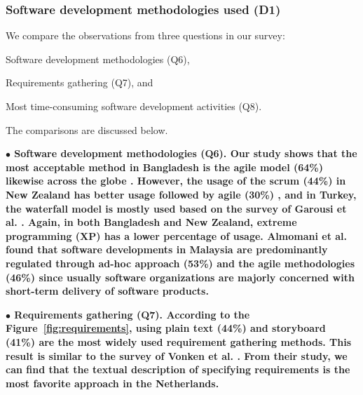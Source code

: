 \subsubsection{Software development methodologies used (D1)}\label{sec:rq2-d1}
% 

We compare the observations from three questions in our survey: \begin{inparaenum}
\item Software development methodologies (Q6),
\item Requirements gathering (Q7), and
\item Most time-consuming software development activities (Q8).
\end{inparaenum} The comparisons are discussed below.

\nd\bf{$\bullet$ Software development methodologies (Q6).} Our study shows that
the most acceptable method in Bangladesh is the agile model (64\%) likewise
across the globe \citep{StackoverflowSurvey2018}. However, the usage of the
scrum (44\%) in New Zealand has better usage followed by agile (30\%)
\citep{Wang2018}, and in Turkey, the waterfall model is mostly used based on the
survey of Garousi et al. \citep{Garousi2015}. Again, in both Bangladesh and New
Zealand, extreme programming (XP) has a lower percentage of usage. Almomani et
al. \citep{Almomani2015} found that software developments in Malaysia are
predominantly regulated through ad-hoc approach (53\%) and the agile
methodologies (46\%) since usually software organizations are majorly concerned
with short-term delivery of software products.

\nd\bf{$\bullet$ Requirements gathering (Q7).} According to the
Figure~\ref{fig:requirements}, using plain text (44\%) and storyboard (41\%) are
the most widely used requirement gathering methods. This result is similar to
the survey of Vonken et al. \citep{Vonken2012}. From their study, we can find
that the textual description of specifying requirements is the most favorite
approach in the Netherlands.

